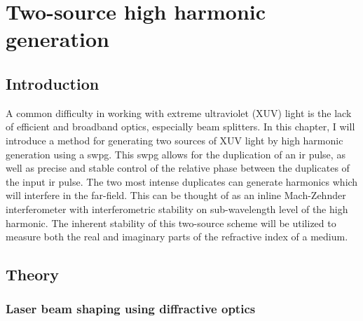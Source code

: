 \chapter{Two-source high harmonic generation}
\label{two_source}

\section{Introduction}
\label{intro_ts}

A common difficulty in working with extreme ultraviolet (XUV) light is the lack of efficient and broadband optics, especially beam splitters. In this chapter, I will introduce a method for generating two sources of XUV light by high harmonic generation using a \gls{swpg}.  This \gls{swpg} allows for the duplication of an \gls{ir} pulse, as well as precise and stable control of the relative phase between the duplicates of the input \gls{ir} pulse. The two most intense duplicates can generate harmonics which will interfere in the far-field. This can be thought of as an inline Mach-Zehnder interferometer with interferometric stability on sub-wavelength level of the high harmonic. The inherent stability of this two-source scheme will be utilized to measure both the real and imaginary parts of the refractive index of a medium.

\section{Theory}
\subsection{Laser beam shaping using diffractive optics}
\label{sec:beam_shaping}

